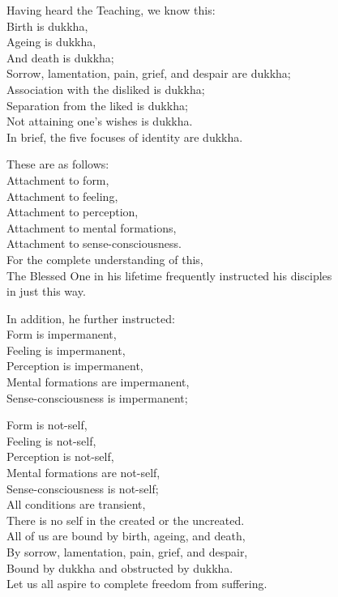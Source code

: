 Having heard the Teaching, we know this:\\
Birth is dukkha,\\
Ageing is dukkha,\\
And death is dukkha;\\
Sorrow, lamentation, pain, grief, and despair are dukkha;\\
Association with the disliked is dukkha;\\
Separation from the liked is dukkha;\\
Not attaining one's wishes is dukkha.\\
In brief, the five focuses of identity are dukkha.

These are as follows:\\
Attachment to form,\\
Attachment to feeling,\\
Attachment to perception,\\
Attachment to mental formations,\\
Attachment to sense-consciousness.\\
For the complete understanding of this,\\
The Blessed One in his lifetime frequently instructed his disciples \\in just this way.

In addition, he further instructed:\\
Form is impermanent,\\
Feeling is impermanent,\\
Perception is impermanent,\\
Mental formations are impermanent,\\
Sense-consciousness is impermanent;

Form is not-self,\\
Feeling is not-self,\\
Perception is not-self,\\
Mental formations are not-self,\\
Sense-consciousness is not-self;\\
All conditions are transient,\\
There is no self in the created or the uncreated.\\
All of us are bound by birth, ageing, and death,\\
By sorrow, lamentation, pain, grief, and despair,\\
Bound by dukkha and obstructed by dukkha.\\
Let us all aspire to complete freedom from suffering.

